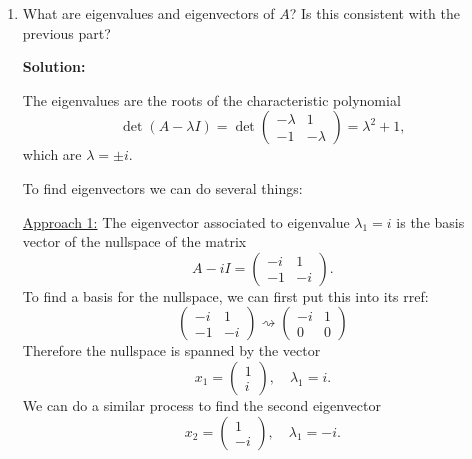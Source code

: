 \documentclass[11pt]{article}
\begin{document}
\begin{enumerate}
\begin{enumerate}
\item What are eigenvalues and eigenvectors of $A$?  Is this consistent with the previous part?

\textbf{Solution:} 

The eigenvalues are the roots of the characteristic polynomial
\[ \det(A - \lambda I) = \det \begin{pmatrix} -\lambda & 1 \\ -1 & -\lambda \end{pmatrix}  = \lambda^2 + 1, \]
which are $\lambda = \pm i$.

To find eigenvectors we can do several things:

\underline{Approach 1:} The eigenvector associated to eigenvalue $\lambda_1 = i$ is the basis vector of the nullspace of the matrix
\[A -i I = \begin{pmatrix} -i & 1 \\ -1 & -i \end{pmatrix}.\]
To find a basis for the nullspace, we can first put this into its rref:
\[\begin{pmatrix} -i & 1 \\ -1 & -i \end{pmatrix} \rightsquigarrow \begin{pmatrix} -i & 1 \\ 0 & 0 \end{pmatrix}  \]
Therefore the nullspace is spanned by the vector
\[ x_1 = \begin{pmatrix} 1 \\ i \end{pmatrix}, \quad \lambda_1 = i.\]
We can do a similar process to find the second eigenvector 
\[x_2 = \begin{pmatrix} 1 \\ -i \end{pmatrix}, \quad \lambda_1 = -i.\]


\end{enumerate}
\end{enumerate}
\end{document}
